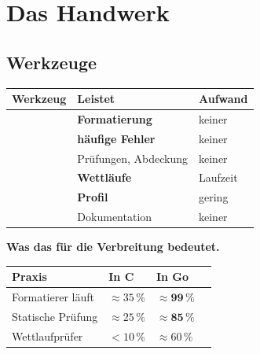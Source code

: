 \part{Das Handwerk}

\chapter{Werkzeuge}\label{kap:werkzeuge}

\begin{merksatz}
\begin{center}
{\small
\renewcommand{\arraystretch}{1.5}
\begin{tabular}{@{}P{2.6cm}P{3.0cm}P{2.4cm}@{}}
\toprule
\textbf{Werkzeug} & \textbf{Leistet} & \textbf{Aufwand}\\
\midrule
{} & \textbf{Formatierung} & \textcolor{gruen}{keiner}\\
 & \textbf{häufige Fehler} & \textcolor{gruen}{keiner}\\
 & Prüfungen, Abdeckung & \textcolor{gruen}{keiner}\\
 & \textbf{Wettläufe} & \textcolor{mittel}{Laufzeit}\\
 & \textbf{Profil} & \textcolor{gruen}{gering}\\
 & Dokumentation & \textcolor{gruen}{keiner}\\
\bottomrule
\end{tabular}}
\end{center}

\begin{center}
\begin{minipage}{0.88\textwidth}
\end{minipage}
\end{center}

\textbf{Was das für die Verbreitung bedeutet.}

\begin{center}
\renewcommand{\arraystretch}{1.45}
\begin{tabular}{@{}P{3.0cm}P{2.2cm}P{2.4cm}P{1.6cm}@{}}
\toprule
\textbf{Praxis} & \textbf{In C} & \textbf{In Go} & \\
\midrule
Formatierer läuft & $\approx35\,\%$ & \textcolor{gruen}{$\approx\mathbf{99\,\%}$} & \\
Statische Prüfung & $\approx25\,\%$ & \textcolor{gruen}{$\approx\mathbf{85\,\%}$} & \\
Wettlaufprüfer & $<10\,\%$ & \textcolor{gruen}{$\approx60\,\%$} & \\
\bottomrule
\end{tabular}
\end{center}


\end{merksatz}
